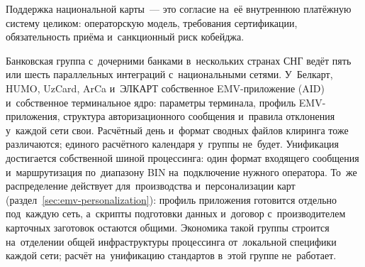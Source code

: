 Поддержка национальной карты~--- это согласие на~её внутреннюю платёжную систему
целиком: операторскую модель, требования сертификации, обязательность приёма
и~санкционный риск кобейджа.


Банковская группа с~дочерними банками в~нескольких странах СНГ ведёт пять или
шесть параллельных интеграций с~национальными сетями. У~Белкарт, HUMO, UzCard,
ArCa и~ЭЛКАРТ собственное EMV-приложение (AID) и~собственное терминальное ядро:
параметры терминала, профиль EMV-приложения, структура авторизационного
сообщения и~правила отклонения у~каждой сети свои.
Расчётный день и~формат сводных файлов клиринга тоже различаются; единого расчётного
календаря у~группы не~будет. Унификация достигается собственной шиной
процессинга: один формат входящего сообщения и~маршрутизация по~диапазону BIN
на~подключение нужного оператора. То~же распределение действует
для~производства и~персонализации карт (раздел~\ref{sec:emv-personalization}): профиль приложения готовится отдельно
под~каждую сеть, а~скрипты подготовки данных и~договор с~производителем
карточных заготовок остаются общими. Экономика такой группы строится
на~отделении общей инфраструктуры процессинга от~локальной специфики каждой
сети; расчёт на~унификацию стандартов в~этой группе не~работает.
